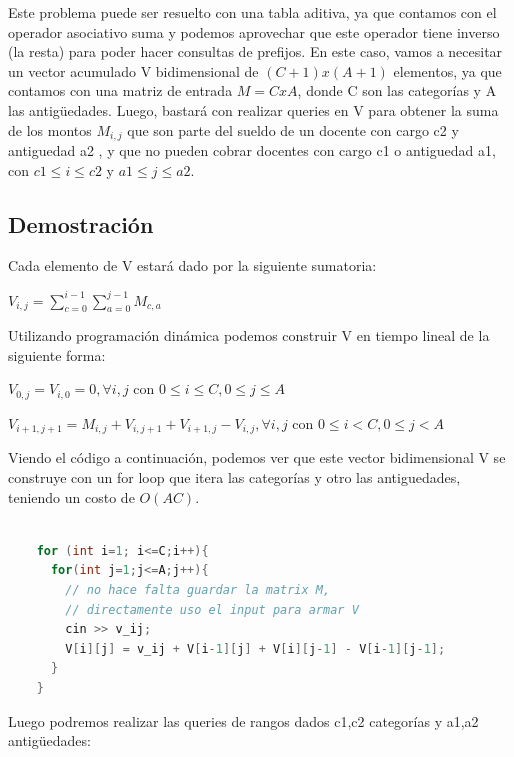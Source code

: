 \documentclass[a4paper]{article}
\begin{document}
Este problema puede ser resuelto con una tabla aditiva, ya que contamos con el operador asociativo suma y podemos aprovechar que este operador tiene inverso (la resta) para poder hacer consultas de prefijos. En este caso, vamos a necesitar un vector acumulado V bidimensional de $(C+1)x(A+1)$ elementos, ya que contamos con una matriz de entrada $M = CxA$, donde C son las categorías y A las antigüedades. Luego, bastará con realizar queries en V para obtener la suma de los montos $M_{i,j}$ que son parte del sueldo de un docente con cargo c2 y antiguedad a2 , y que no pueden cobrar docentes con cargo c1 o antiguedad a1, con $c1 \leq i \leq c2$ y $a1 \leq j \leq a2$.


\subsection{Demostración}
Cada elemento de V estará dado por la siguiente sumatoria:\\
\begin{center}
$V_{i,j} = \sum_{c=0}^{i-1}\sum_{a=0}^{j-1} M_{c,a} $
\end{center}


Utilizando programación dinámica podemos construir V en tiempo lineal de la siguiente forma: \\
\begin{center}
$V_{0,j} = V_{i,0} = 0,  \forall i,j$  con  $0 \leq i \leq C, 0 \leq j \leq A$
\end{center}

\begin{center}
$V_{i+1,j+1} = M_{i,j} + V_{i,j+1} + V_{i+1, j} - V_{i,j},   \forall i,j$  con  $0 \leq i < C, 0 \leq j < A$
\end{center}

Viendo el código a continuación, podemos ver que este vector bidimensional V se construye con un for loop que itera las categorías y otro las antiguedades, teniendo un costo de $O(AC)$.

\begin{lstlisting}[language=c++]

    for (int i=1; i<=C;i++){
      for(int j=1;j<=A;j++){
        // no hace falta guardar la matrix M, 
        // directamente uso el input para armar V
        cin >> v_ij; 
        V[i][j] = v_ij + V[i-1][j] + V[i][j-1] - V[i-1][j-1];
      }
    }

\end{lstlisting}
Luego podremos realizar las queries de rangos dados c1,c2 categorías y a1,a2 antigüedades:
\end{document}
